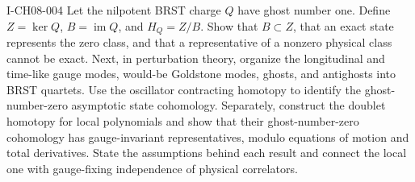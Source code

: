 \begin{exercise}{I-CH08-004}
Let the nilpotent BRST charge $Q$ have ghost number one.  Define
$Z=\ker Q$, $B=\operatorname{im}Q$, and $H_Q=Z/B$.
Show that $B\subset Z$, that an exact state represents the zero class, and
that a representative of a nonzero physical class cannot be exact.  Next,
in perturbation theory, organize the longitudinal and time-like gauge modes,
would-be Goldstone modes, ghosts, and antighosts into BRST quartets.  Use the
oscillator contracting homotopy to identify the ghost-number-zero asymptotic
state cohomology.  Separately, construct the doublet homotopy for local
polynomials and show that their ghost-number-zero cohomology has
gauge-invariant representatives, modulo equations of motion and total
derivatives.  State the assumptions behind each result and connect the local
one with gauge-fixing independence of physical correlators.
\end{exercise}
